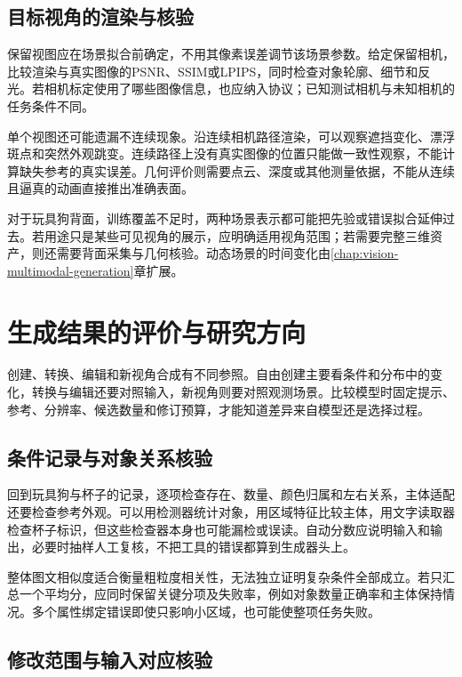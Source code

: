 \subsection{目标视角的渲染与核验}
\label{sec:vision-generation-rendering-check}

保留视图应在场景拟合前确定，不用其像素误差调节该场景参数。给定保留相机，比较渲染与真实图像的PSNR、SSIM或LPIPS，同时检查对象轮廓、细节和反光。若相机标定使用了哪些图像信息，也应纳入协议；已知测试相机与未知相机的任务条件不同。

单个视图还可能遗漏不连续现象。沿连续相机路径渲染，可以观察遮挡变化、漂浮斑点和突然外观跳变。连续路径上没有真实图像的位置只能做一致性观察，不能计算缺失参考的真实误差。几何评价则需要点云、深度或其他测量依据，不能从连续且逼真的动画直接推出准确表面。

对于玩具狗背面，训练覆盖不足时，两种场景表示都可能把先验或错误拟合延伸过去。若用途只是某些可见视角的展示，应明确适用视角范围；若需要完整三维资产，则还需要背面采集与几何核验。动态场景的时间变化由\ref{chap:vision-multimodal-generation}章扩展。

\section{生成结果的评价与研究方向}
\label{sec:vision-generation-evaluation}

创建、转换、编辑和新视角合成有不同参照。自由创建主要看条件和分布中的变化，转换与编辑还要对照输入，新视角则要对照观测场景。比较模型时固定提示、参考、分辨率、候选数量和修订预算，才能知道差异来自模型还是选择过程。

\subsection{条件记录与对象关系核验}
\label{sec:vision-generation-condition-check}

回到玩具狗与杯子的记录，逐项检查存在、数量、颜色归属和左右关系，主体适配还要检查参考外观。可以用检测器统计对象，用区域特征比较主体，用文字读取器检查杯子标识，但这些检查器本身也可能漏检或误读。自动分数应说明输入和输出，必要时抽样人工复核，不把工具的错误都算到生成器头上。

整体图文相似度适合衡量粗粒度相关性，无法独立证明复杂条件全部成立。若只汇总一个平均分，应同时保留关键分项及失败率，例如对象数量正确率和主体保持情况。多个属性绑定错误即使只影响小区域，也可能使整项任务失败。

\subsection{修改范围与输入对应核验}
\label{sec:vision-generation-change-check}

